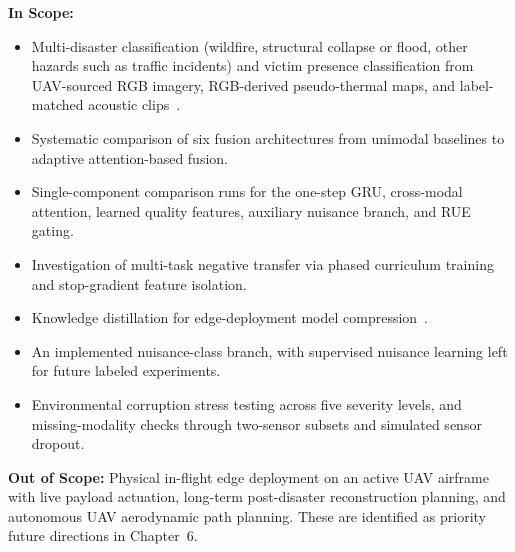 \textbf{In Scope:}
\begin{itemize}
    \item Multi-disaster classification (wildfire, structural collapse or flood, other hazards such as traffic incidents) and victim presence classification from UAV-sourced RGB imagery, RGB-derived pseudo-thermal maps, and label-matched acoustic clips~\cite{erdelj2017help}.
    \item Systematic comparison of six fusion architectures from unimodal baselines to adaptive attention-based fusion.
    \item Single-component comparison runs for the one-step GRU, cross-modal attention, learned quality features, auxiliary nuisance branch, and RUE gating.
    \item Investigation of multi-task negative transfer via phased curriculum training and stop-gradient feature isolation.
    \item Knowledge distillation for edge-deployment model compression~\cite{hinton2015distilling}.
    \item An implemented nuisance-class branch, with supervised nuisance learning left for future labeled experiments.
    \item Environmental corruption stress testing across five severity levels, and missing-modality checks through two-sensor subsets and simulated sensor dropout.
\end{itemize}

\textbf{Out of Scope:} Physical in-flight edge deployment on an active UAV airframe with live payload actuation, long-term post-disaster reconstruction planning, and autonomous UAV aerodynamic path planning. These are identified as priority future directions in Chapter~6.


